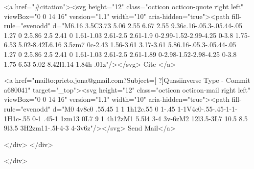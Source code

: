       <a  href="#citation"><svg height="12" class="octicon octicon-quote right left" viewBox="0 0 14 16" version="1.1" width="10" aria-hidden="true"><path fill-rule="evenodd" d="M6.16 3.5C3.73 5.06 2.55 6.67 2.55 9.36c.16-.05.3-.05.44-.05 1.27 0 2.5.86 2.5 2.41 0 1.61-1.03 2.61-2.5 2.61-1.9 0-2.99-1.52-2.99-4.25 0-3.8 1.75-6.53 5.02-8.42L6.16 3.5zm7 0c-2.43 1.56-3.61 3.17-3.61 5.86.16-.05.3-.05.44-.05 1.27 0 2.5.86 2.5 2.41 0 1.61-1.03 2.61-2.5 2.61-1.89 0-2.98-1.52-2.98-4.25 0-3.8 1.75-6.53 5.02-8.42l1.14 1.84h-.01z"/></svg> Cite
      </a>

      <a href="mailto:prieto.jona@gmail.com?Subject=[ ?]Quasiinverse Type - Commit a680041" target="_top"><svg height="12" class="octicon octicon-mail right left" viewBox="0 0 14 16" version="1.1" width="10" aria-hidden="true"><path fill-rule="evenodd" d="M0 4v8c0 .55.45 1 1 1h12c.55 0 1-.45 1-1V4c0-.55-.45-1-1-1H1c-.55 0-1 .45-1 1zm13 0L7 9 1 4h12zM1 5.5l4 3-4 3v-6zM2 12l3.5-3L7 10.5 8.5 9l3.5 3H2zm11-.5l-4-3 4-3v6z"/></svg> Send Mail</a>

    </div>
  </div>

</div>





